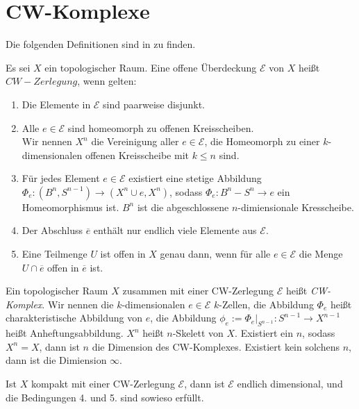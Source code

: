 \section{CW-Komplexe}

Die folgenden Definitionen sind in \cite{dold} zu finden.

\begin{definition}
    \label{def: cw-komplex}
    Es sei $X$ ein topologischer Raum. Eine offene Überdeckung $\mathcal{E}$ von $X$ heißt 
    $CW-Zerlegung$, wenn gelten:
    \begin{enumerate}
        \item Die Elemente in $\mathcal{E}$ sind paarweise disjunkt.
        \item Alle $e \in \mathcal{E}$ sind homeomorph zu offenen Kreisscheiben. \\
            Wir nennen $X^n$ die Vereinigung aller $e \in \mathcal{E}$, die Homeomorph zu einer
            $k$-dimensionalen offenen Kreisscheibe mit $k \leq n$ sind.
        \item Für jedes Element $e \in \mathcal{E}$ existiert eine stetige Abbildung
            $\Phi_e \colon (B^n, S^{n - 1}) \to (X^n \cup e, X^n)$, sodass 
            $\Phi_e \colon B^n - S^n \to e$ ein Homeomorphismus ist. $B^n$ ist die abgeschlossene 
            $n$-dimiensionale Kresscheibe.
        \item Der Abschluss $\overline{e}$ enthält nur endlich viele Elemente aus $\mathcal{E}$.
        \item Eine Teilmenge $U$ ist offen in $X$ genau dann, wenn für alle $e \in \mathcal{E}$ die
            Menge $U \cap \overline{e}$ offen in $\overline{e}$ ist. 
    \end{enumerate}
    
    Ein topologischer Raum $X$ zusammen mit einer CW-Zerlegung $\mathcal{E}$ heißt 
    \textit{CW-Komplex}.
    Wir nennen die $k$-dimensionalen $e \in \mathcal{E}$ $k$-Zellen, die Abbildung $\Phi_e$
    heißt charakteristische Abbildung von $e$, die Abbildung 
    $\phi_e := \Phi_e|_{S^{n - 1}} \colon S^{n - 1} \to X^{n - 1}$ heißt Anheftungsabbildung.
    $X^n$ heißt $n$-Skelett von $X$. Existiert ein $n$, sodass $X^n = X$, dann ist $n$ die 
    Dimension des CW-Komplexes. Existiert kein solchens $n$, dann ist die Dimiension $\infty$.
\end{definition}

\begin{remark}
    Ist $X$ kompakt mit einer CW-Zerlegung $\mathcal{E}$, dann ist $\mathcal{E}$ endlich dimensional, 
    und die Bedingungen 4. und 5. sind sowieso erfüllt.
\end{remark}


